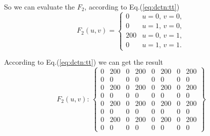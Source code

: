 \documentclass{article}
\begin{document}
    So we can evaluate the $F_2$, according to Eq.(\ref{eq:dctn:tt})
    \begin{equation}
    \label{eq:dctn:f2}
    F_2(u,v) = \left\{
        \begin{array}{rl}
        0 & u=0,\,v=0, \\
        0 & u=1,\,v=0, \\
        200 & u=0,\,v=1, \\
        0 & u=1,\,v=1. 
        \end{array}
    \right.
    \end{equation}
    
    According to Eq.(\ref{eq:dctn:tt}) we can get the result
    $$
        F_2(u,v):\, \left\{ \begin{array}{rrrrrrrr}
        0 & 200 & 0 & 200 & 0 & 200 & 0 & 200 \\
        0 & 0 & 0 & 0 & 0 & 0 & 0 & 0 \\
        0 & 200 & 0 & 200 & 0 & 200 & 0 & 200 \\
        0 & 0 & 0 & 0 & 0 & 0 & 0 & 0 \\
        0 & 200 & 0 & 200 & 0 & 200 & 0 & 200 \\
        0 & 0 & 0 & 0 & 0 & 0 & 0 & 0 \\
        0 & 200 & 0 & 200 & 0 & 200 & 0 & 200 \\
        0 & 0 & 0 & 0 & 0 & 0 & 0 & 0         
        \end{array} \right\}
    $$
    
    
    
    
    
    
    
\end{document}
